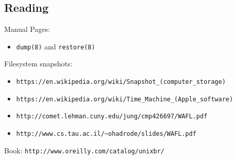 \documentclass[xga]{xdvislides}
\begin{document}
\subsection{Reading}
Manual Pages:
\begin{itemize}
	\item \verb+dump(8)+ and \verb+restore(8)+
\end{itemize}
Filesystem snapshots:
\begin{itemize}
	\item \verb+https://en.wikipedia.org/wiki/Snapshot_(computer_storage)+
	\item \verb+https://en.wikipedia.org/wiki/Time_Machine_(Apple_software)+
	\item \verb+http://comet.lehman.cuny.edu/jung/cmp426697/WAFL.pdf+
	\item \verb+http://www.cs.tau.ac.il/~ohadrode/slides/WAFL.pdf+
\end{itemize}
\vspace{.5in}
Book: \verb+http://www.oreilly.com/catalog/unixbr/+
\end{document}

